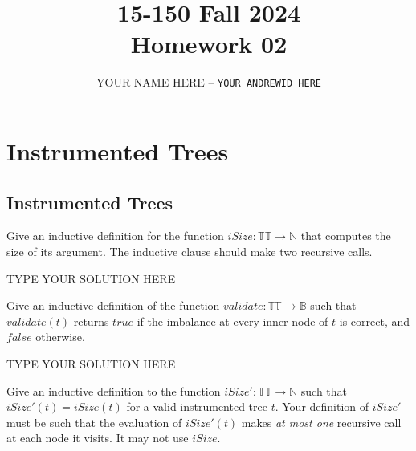 \documentclass[11pt]{article}
\title{\textbf{15-150 Fall 2024\\Homework 02}}
\author{YOUR NAME HERE -- \texttt{YOUR ANDREWID HERE}}
\newcommand{\declarecommand}[1]{\providecommand{#1}{}\renewcommand{#1}}
\begin{document}
\maketitle

\declarecommand{\true}{\mathit{true}}
\declarecommand{\false}{\mathit{false}}
\declarecommand{\Empty}{\mathit{Empty}}
\declarecommand{\Leaf}{\mathit{Leaf}}
\declarecommand{\Node}{\mathit{Node}}
\declarecommand{\iEmpty}{\mathit{iEmpty}}
\declarecommand{\iLeaf}{\mathit{iLeaf}}
\declarecommand{\iNode}{\mathit{iNode}}
\declarecommand{\validate}{\mathit{validate}}
\declarecommand{\iSize}{\mathit{iSize}}
\declarecommand{\iH}{\mathit{iSize'}}
\declarecommand{\tilt}{\mathit{tiltLeft}}
\declarecommand{\Elt}{S}
\section{Instrumented Trees}

\subsection{Instrumented Trees}

\begin{task}{2} %
Give an inductive definition for the function $\iSize: \mathbb{TT}
\rightarrow \mathbb{N}$ that computes the size of its argument.  The
inductive clause should make two recursive calls.
\end{task}

\begin{solution}
TYPE YOUR SOLUTION HERE
\end{solution}


\begin{task}{2} %
Give an inductive definition of the function $\validate: \mathbb{TT}
\rightarrow \mathbb{B}$ such that $\validate(t)$ returns $\true$ if the
imbalance at every inner node of $t$ is correct, and $\false$ otherwise.
\end{task}

\begin{solution}
TYPE YOUR SOLUTION HERE
\end{solution}


\begin{task}{2} %
Give an inductive definition to the function $\iH: \mathbb{TT} \rightarrow
\mathbb{N}$ such that $\iH(t) = \iSize(t)$ for a valid instrumented tree
$t$.  Your definition of $\iH$ must be such that the evaluation of $\iH(t)$
makes \emph{at most one} recursive call at each node it visits.  It may not
use $\iSize$.
\end{task}
\end{document}
